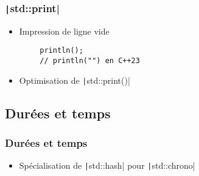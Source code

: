 \documentclass[C++.tex]{subfiles}
\begin{document}
\begin{frame}[fragile]
	\frametitle{\texttt|std::print|}
	\begin{itemize}
		\item Impression de ligne vide
	\end{itemize}

	\begin{verbatim}
		println();
		// println("") en C++23
	\end{verbatim}

	\begin{itemize}
		\item Optimisation de \texttt|std::print()|
	\end{itemize}


\end{frame}

\subsection*{Durées et temps}
\begin{frame}[fragile]
	\frametitle{Durées et temps}
	\begin{itemize}
		\item Spécialisation de \texttt|std::hash| pour \texttt|std::chrono|
	\end{itemize}

\end{frame}
\end{document}
